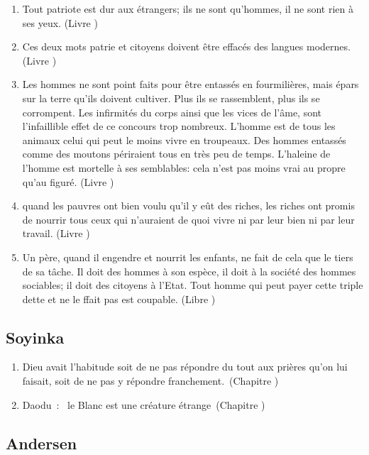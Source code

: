 \documentclass[a4paper, 11pt, hidelinks]{article}
\newcommand{\rb}[1]{\Romanbar{#1}}
\begin{document}
\begin{enumerate}
    \item Tout patriote est dur aux étrangers; ils ne sont qu'hommes, il ne sont rien à ses yeux. (Livre \rb{1})
    \item Ces deux mots patrie et citoyens doivent être effacés des langues modernes. (Livre \rb{1})
    \item Les hommes ne sont point faits pour être entassés en fourmilières, mais épars sur la terre qu'ils doivent cultiver. Plus ils se rassemblent, plus ils se corrompent. Les infirmités du corps ainsi que les vices de l'âme, sont l'infaillible effet de ce concours trop nombreux. L'homme est de tous les animaux celui qui peut le moins vivre en troupeaux. Des hommes entassés comme des moutons périraient tous en très peu de temps. L'haleine de l'homme est mortelle à ses semblables: cela n'est pas moins vrai au propre qu'au figuré. (Livre \rb{1})
    \item quand les pauvres ont bien voulu qu'il y eût des riches, les riches ont promis de nourrir tous ceux qui n'auraient de quoi vivre ni par leur bien ni par leur travail. (Livre \rb{2})
    \item Un père, quand il engendre et nourrit les enfants, ne fait de cela que le tiers de sa tâche. Il doit des hommes à son espèce, il doit à la société des hommes sociables; il doit des citoyens à l'Etat. Tout homme qui peut payer cette triple dette et ne le ffait pas est coupable. (Libre \rb{1})
\end{enumerate}



\subsection{Soyinka}


\begin{enumerate}
    \item Dieu avait l'habitude soit de ne pas répondre du tout aux prières qu'on lui faisait, soit de ne pas y répondre franchement. (Chapitre \rb{4})
    \item Daodu : \og le Blanc est une créature étrange \fg (Chapitre \rb{15})
\end{enumerate}




\subsection{Andersen}
\end{document}
